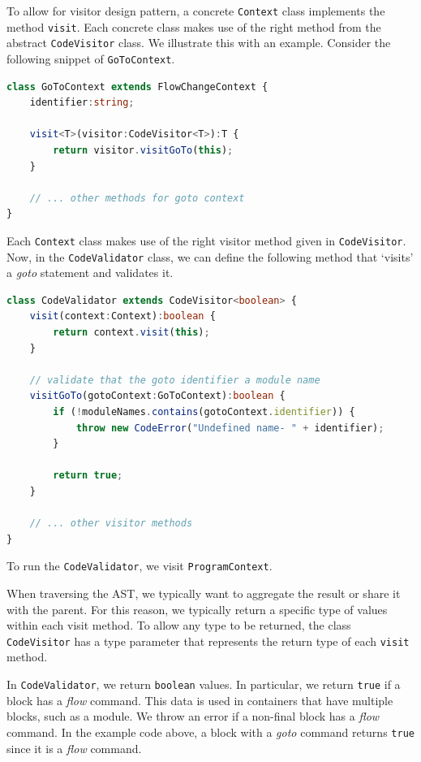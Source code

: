To allow for visitor design pattern, a concrete \texttt{Context} class implements the method \texttt{visit}. Each concrete class makes use of the right method from the abstract \texttt{CodeVisitor} class. We illustrate this with an example. Consider the following snippet of \texttt{GoToContext}.
\begin{lstlisting}[language=TypeScript]
class GoToContext extends FlowChangeContext {    
    identifier:string;
    
    visit<T>(visitor:CodeVisitor<T>):T {
        return visitor.visitGoTo(this);
    }

    // ... other methods for goto context
}
\end{lstlisting}
    Each \texttt{Context} class makes use of the right visitor method given in \texttt{CodeVisitor}. Now, in the \texttt{CodeValidator} class, we can define the following method that `visits' a \textit{goto} statement and validates it.
\begin{lstlisting}[language=TypeScript]
class CodeValidator extends CodeVisitor<boolean> {
    visit(context:Context):boolean {
        return context.visit(this);
    }
    
    // validate that the goto identifier a module name
    visitGoTo(gotoContext:GoToContext):boolean {
        if (!moduleNames.contains(gotoContext.identifier)) {
            throw new CodeError("Undefined name- " + identifier);
        }

        return true;
    }

    // ... other visitor methods
}
\end{lstlisting}
To run the \texttt{CodeValidator}, we visit \texttt{ProgramContext}.

When traversing the AST, we typically want to aggregate the result or share it with the parent. For this reason, we typically return a specific type of values within each visit method. To allow any type to be returned, the class \texttt{CodeVisitor} has a type parameter that represents the return type of each \texttt{visit} method.

In \texttt{CodeValidator}, we return \texttt{boolean} values. In particular, we return \texttt{true} if a block has a \textit{flow} command. This data is used in containers that have multiple blocks, such as a module. We throw an error if a non-final block has a \textit{flow} command. In the example code above, a block with a \textit{goto} command returns \texttt{true} since it is a \textit{flow} command. 


